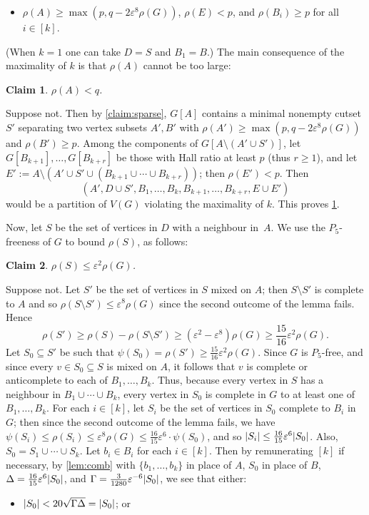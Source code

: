 \documentclass[11pt,reqno]{amsart}
\newtheorem{claim}{Claim}[theorem]
\let\oldendproof\endproof
\renewenvironment{proof}[1][\proofname]{%
	\oldproof[\normalfont\bfseries #1]%
}{\oldendproof}
\renewcommand{\qedsymbol}{$\blacksquare$}%
\newenvironment{subproof}[1][\normalfont\it Subproof]{%
	\renewcommand{\qedsymbol}{$\square$}%
	\begin{proof}[#1]%
	}{%
	\end{proof}%
}
\newcommand{\eps}{\varepsilon}
\renewcommand{\subset}{\subseteq}
\DeclarePairedDelimiter\abs{\lvert}{\rvert}%
\begin{document}
\begin{proof}
\begin{itemize}
			\item $\rho(A)\ge \max(p,q-2\eps^8\rho(G))$, $\rho(E)<p$, and $\rho(B_i)\ge p$ for all $i\in[k]$.
		\end{itemize}
		(When $k=1$ one can take $D=S$ and $B_1=B$.)
		The main consequence of the maximality of $k$ is that $\rho(A)$ cannot be too large:
		\begin{claim}
			\label{claim:smalla}
			$\rho(A)<q$.
		\end{claim}
		\begin{subproof}
			Suppose not.
			Then by \cref{claim:sparse}, $G[A]$ contains a minimal nonempty cutset $S'$ separating two vertex subsets $A',B'$ with $\rho(A')\ge\max(p,q-2\eps^8\rho(G))$ and $\rho(B')\ge p$.
			Among the components of $G[A\setminus(A'\cup S')]$, let $G[B_{k+1}],\ldots,G[B_{k+r}]$ be those with Hall ratio at least $p$ (thus $r\ge1$), and let $E':=A\setminus(A'\cup S'\cup(B_{k+1}\cup\cdots\cup B_{k+r}))$; then $\rho(E')<p$.
			Then
			\[(A',D\cup S',B_1,\ldots,B_k,B_{k+1},\ldots,B_{k+r},E\cup E')\]
			would be a partition of $V(G)$ violating the maximality of $k$.
			This proves \cref{claim:smalla}.
		\end{subproof}
		
		Now, let $S$ be the set of vertices in $D$ with a neighbour in~$A$.
		We use the $P_5$-freeness of $G$ to bound $\rho(S)$, as follows:
		\begin{claim}
			\label{claim:smalls}
			$\rho(S)\le\eps^2\rho(G)$.
		\end{claim}
		\begin{subproof}
			Suppose not. Let $S'$ be the set of vertices in $S$ mixed on $A$; then $S\setminus S'$ is complete to $A$ and so $\rho(S\setminus S')\le\eps^8\rho(G)$ since the second outcome of the lemma fails.
			Hence
			\[\rho(S')\ge\rho(S)-\rho(S\setminus S')\ge(\eps^2-\eps^8)\rho(G)\ge\frac{15}{16}\eps^2\rho(G).\]
			Let $S_0\subset S'$ be such that $\psi(S_0)=\rho(S')\ge\frac{15}{16}\eps^2\rho(G)$.
			Since $G$ is $P_5$-free, and since every $v\in S_0\subset S$ is mixed on $A$, it follows that $v$ is complete or anticomplete to each of $B_1,\ldots,B_k$.
			Thus, because every vertex in $S$ has a neighbour in $B_1\cup\cdots\cup B_k$, every vertex in $S_0$ is complete in $G$ to at least one of $B_1,\ldots,B_k$.
			For each $i\in[k]$, let $S_i$ be the set of vertices in $S_0$ complete to $B_i$ in $G$; then since the second outcome of the lemma fails, we have $\psi(S_i)\le\rho(S_i)\le\eps^8\rho(G)\le\frac{16}{15}\eps^6\cdot\psi(S_0)$,
			and so $\abs{S_i}\le\frac{16}{15}\eps^6\abs{S_0}$.
			Also, $S_0=S_1\cup\cdots\cup S_k$.
			Let $b_i\in B_i$ for each $i\in[k]$.
			Then by remunerating $[k]$ if necessary, by \cref{lem:comb} with $\{b_1,\ldots,b_k\}$ in place of $A$, $S_0$ in place of $B$, $\Delta=\frac{16}{15}\eps^6\abs{S_0}$, and $\Gamma=\frac3{1280}\eps^{-6}\abs{S_0}$, we see that either:
			\begin{itemize}
				\item $\abs{S_0}<20\sqrt{\Gamma\Delta}=\abs{S_0}$; or
				

\end{itemize}
\end{subproof}
\end{proof}
\end{document}

